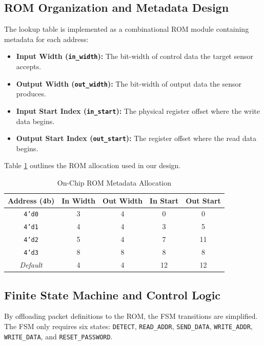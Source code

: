 \documentclass[conference]{IEEEtran}
\begin{document}
\subsection{ROM Organization and Metadata Design}
The lookup table is implemented as a combinational ROM module containing metadata for each address:
\begin{itemize}
    \item \textbf{Input Width (\texttt{in\_width}):} The bit-width of control data the target sensor accepts.
    \item \textbf{Output Width (\texttt{out\_width}):} The bit-width of output data the sensor produces.
    \item \textbf{Input Start Index (\texttt{in\_start}):} The physical register offset where the write data begins.
    \item \textbf{Output Start Index (\texttt{out\_start}):} The register offset where the read data begins.
\end{itemize}

Table \ref{tab:rom_map} outlines the ROM allocation used in our design.

\begin{table}[htbp]
\caption{On-Chip ROM Metadata Allocation}
\label{tab:rom_map}
\centering
\begin{tabular}{ccccc}
\toprule
\textbf{Address (4b)} & \textbf{In Width} & \textbf{Out Width} & \textbf{In Start} & \textbf{Out Start} \\
\midrule
\texttt{4'd0} & 3 & 4 & 0 & 0 \\
\texttt{4'd1} & 4 & 4 & 3 & 5 \\
\texttt{4'd2} & 5 & 4 & 7 & 11 \\
\texttt{4'd3} & 8 & 8 & 8 & 8 \\
\textit{Default} & 4 & 4 & 12 & 12 \\
\bottomrule
\end{tabular}
\end{table}

\subsection{Finite State Machine and Control Logic}
By offloading packet definitions to the ROM, the FSM transitions are simplified. The FSM only requires six states: \texttt{DETECT}, \texttt{READ\_ADDR}, \texttt{SEND\_DATA}, \texttt{WRITE\_ADDR}, \texttt{WRITE\_DATA}, and \texttt{RESET\_PASSWORD}.
\end{document}
